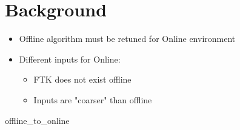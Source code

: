 \section{Background}

    { \begin{itemize}
        \item Offline algorithm must be retuned for Online environment
        \item Different inputs for Online:
            \begin{itemize}
                \item FTK does not exist offline
                \item Inputs are "coarser" than offline
            \end{itemize} 
    \end{itemize} }
    {offline_to_online}


